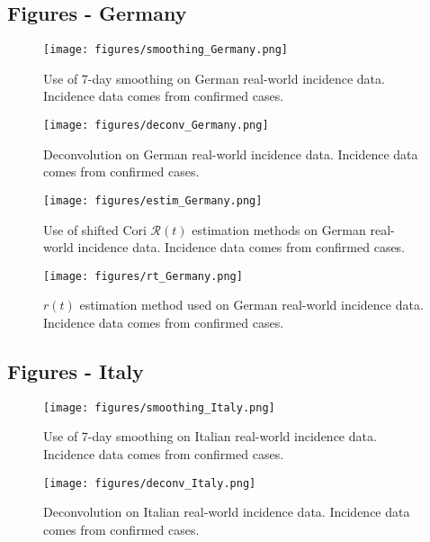\documentclass{article}
\newcommand{\nR}{\mathcal{R}}
\newcommand{\nr}{r}
\begin{document}
\subsection{Figures - Germany}
\begin{figure}[h!]
    \centering
    \texttt{[image: figures/smoothing\_Germany.png]}
    \caption{Use of 7-day smoothing on German real-world incidence data. Incidence data comes from confirmed cases.}
    \label{fig:my_label}
\end{figure}

\begin{figure}
    \centering
    \texttt{[image: figures/deconv\_Germany.png]}
    \caption{Deconvolution on German real-world incidence data. Incidence data comes from confirmed cases.}
    \label{fig:my_label}
\end{figure}

\begin{figure}[h!]
    \centering
    \texttt{[image: figures/estim\_Germany.png]}
    \caption{Use of shifted Cori $\nR(t)$ estimation methods on German real-world incidence data. Incidence data comes from confirmed cases.}
    \label{fig:my_label}
\end{figure}

\clearpage
\begin{figure}[h!]
    \centering
    \texttt{[image: figures/rt\_Germany.png]}
    \caption{$\nr(t)$ estimation method used on German real-world incidence data. Incidence data comes from confirmed cases.}
    \label{fig:my_label}
\end{figure}

\clearpage
\subsection{Figures - Italy}
\begin{figure}[h!]
    \centering
    \texttt{[image: figures/smoothing\_Italy.png]}
    \caption{Use of 7-day smoothing on Italian real-world incidence data. Incidence data comes from confirmed cases.}
    \label{fig:my_label}
\end{figure}

\begin{figure}
    \centering
    \texttt{[image: figures/deconv\_Italy.png]}
    \caption{Deconvolution on Italian real-world incidence data. Incidence data comes from confirmed cases.}
    \label{fig:my_label}
\end{figure}
\end{document}
